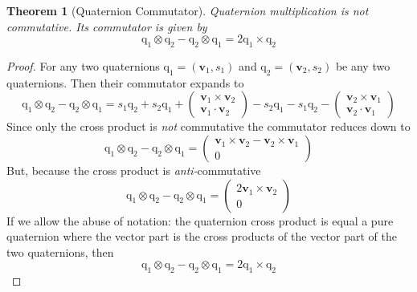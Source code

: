 \documentclass{amsart}
\newtheorem{theorem}{Theorem}[section]
\theoremstyle{definition}
\theoremstyle{remark}
\numberwithin{equation}{section}
\begin{document}
\begin{theorem}[Quaternion Commutator]
  Quaternion multiplication is not commutative. Its commutator is given by
  \begin{equation}
    \mathrm{q}_1\otimes\mathrm{q}_2 - \mathrm{q}_2 \otimes \mathrm{q}_1 = 2 \mathrm{q}_1 \times \mathrm{q}_2 \label{eqn:commutator}
  \end{equation}
\end{theorem}
\begin{proof}
  For any two quaternions $\mathrm{q}_1=(\mathbf{v}_1, s_1)$ and $\mathrm{q}_2=(\mathbf{v}_2, s_2)$ be any two quaternions. Then their commutator expands to
  \begin{equation}
    \mathrm{q}_1\otimes\mathrm{q}_2 - \mathrm{q}_2 \otimes \mathrm{q}_1 =s_1 \mathrm{q}_2 + s_2 \mathrm{q}_1 +
    \begin{pmatrix}
      \mathbf{v}_1\times\mathbf{v}_2 \\
      \mathbf{v}_1\cdot\mathbf{v}_2
    \end{pmatrix}
    - s_2 \mathrm{q}_1 - s_1 \mathrm{q}_2 -
    \begin{pmatrix}
      \mathbf{v}_2\times\mathbf{v}_1 \\
      \mathbf{v}_2\cdot\mathbf{v}_1
    \end{pmatrix}
  \end{equation}
  Since only the cross product is \emph{not} commutative the commutator reduces down to
  \begin{equation}
    \mathrm{q}_1\otimes\mathrm{q}_2 - \mathrm{q}_2 \otimes \mathrm{q}_1 =
    \begin{pmatrix}
      \mathbf{v}_1\times\mathbf{v}_2-\mathbf{v}_2\times\mathbf{v}_1 \\
      0
    \end{pmatrix}
  \end{equation}
  But, because  the cross product is \emph{anti-}commutative
  \begin{equation}
    \mathrm{q}_1\otimes\mathrm{q}_2 - \mathrm{q}_2 \otimes \mathrm{q}_1 =
    \begin{pmatrix}
      2\mathbf{v}_1\times\mathbf{v}_2\\
      0
    \end{pmatrix}
  \end{equation}
  If we allow the abuse of notation: the quaternion cross product is equal a pure quaternion where the vector part is the cross products of the vector part of the two quaternions, then
  \begin{equation}
    \mathrm{q}_1\otimes\mathrm{q}_2 - \mathrm{q}_2 \otimes \mathrm{q}_1 = 2 \mathrm{q}_1\times \mathrm{q}_2
  \end{equation}
\end{proof}
\end{document}
